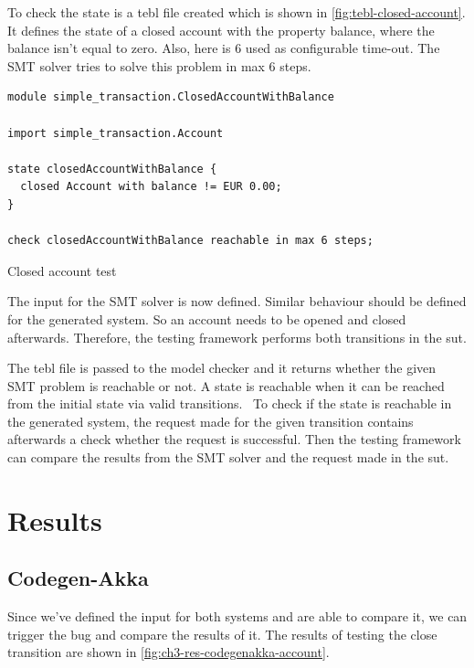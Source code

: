 To check the state is a tebl file created which is shown in
\autoref{fig:tebl-closed-account}. It defines the state of a closed account with
the property balance, where the balance isn't equal to zero. Also, here is 6
used as configurable time-out. The SMT solver tries to solve this problem in
max 6 steps.

\begin{sourcecode}[h!]
\begin{lstlisting}[]
module simple_transaction.ClosedAccountWithBalance

import simple_transaction.Account

state closedAccountWithBalance {
  closed Account with balance != EUR 0.00;
}

check closedAccountWithBalance reachable in max 6 steps;
\end{lstlisting}
\caption{Closed account test}\label{fig:tebl-closed-account}
\end{sourcecode}
\FloatBarrier

The input for the SMT solver is now defined. Similar behaviour should be defined
for the generated system. So an account needs to be opened and closed
afterwards. Therefore, the testing framework performs both transitions in the
\gls{sut}.

The tebl file is passed to the model checker and it returns whether the given
SMT problem is reachable or not. A state is reachable when it can be reached
from the initial state via valid
transitions.~\cite[p.~4]{stoel_storm_vinju_bosman_2016} To check if the state is
reachable in the generated system, the request made for the given transition
contains afterwards a check whether the request is successful. Then the testing
framework can compare the results from the SMT solver and the request made in
the \gls{sut}.

\section{Results}

\subsection{Codegen-Akka}

Since we've defined the input for both systems and are able to compare it, we
can trigger the bug and compare the results of it. The results of testing the
close transition are shown in \autoref{fig:ch3-res-codegenakka-account}.

